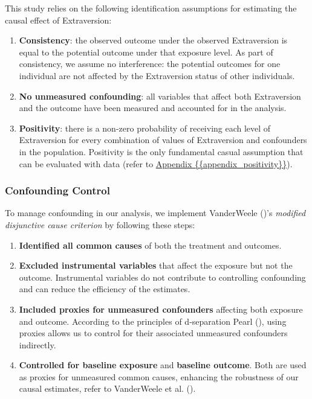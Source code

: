 \documentclass[
  single column]{article}
\providecommand{\tightlist}{%
  \setlength{\itemsep}{0pt}\setlength{\parskip}{0pt}}
\begin{document}
This study relies on the following identification assumptions for
estimating the causal effect of Extraversion:

\begin{enumerate}
\def\labelenumi{\arabic{enumi}.}
\item
  \textbf{Consistency}: the observed outcome under the observed
  Extraversion is equal to the potential outcome under that exposure
  level. As part of consistency, we assume no interference: the
  potential outcomes for one individual are not affected by the
  Extraversion status of other individuals.
\item
  \textbf{No unmeasured confounding}: all variables that affect both
  Extraversion and the outcome have been measured and accounted for in
  the analysis.
\item
  \textbf{Positivity}: there is a non-zero probability of receiving each
  level of Extraversion for every combination of values of Extraversion
  and confounders in the population. Positivity is the only fundamental
  casual assumption that can be evaluated with data (refer to
  \hyperref[appendix-positivity]{Appendix
  \{\{appendix\_positivity\}\}}).
\end{enumerate}

\subsubsection{Confounding Control}\label{confounding-control}

To manage confounding in our analysis, we implement VanderWeele
()'s \emph{modified disjunctive
cause criterion} by following these steps:

\begin{enumerate}
\def\labelenumi{\arabic{enumi}.}
\tightlist
\item
  \textbf{Identified all common causes} of both the treatment and
  outcomes.
\item
  \textbf{Excluded instrumental variables} that affect the exposure but
  not the outcome. Instrumental variables do not contribute to
  controlling confounding and can reduce the efficiency of the
  estimates.
\item
  \textbf{Included proxies for unmeasured confounders} affecting both
  exposure and outcome. According to the principles of d-separation
  Pearl (), using proxies allows us to
  control for their associated unmeasured confounders indirectly.
\item
  \textbf{Controlled for baseline exposure} and \textbf{baseline
  outcome}. Both are used as proxies for unmeasured common causes,
  enhancing the robustness of our causal estimates, refer to VanderWeele
  et al. ().
\end{enumerate}
\end{document}
